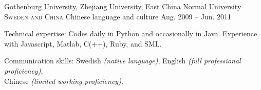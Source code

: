 \documentclass[10pt,a4paper]{article}
\begin{document}
\headedsection
  {\href{http://gu.se/english/}{Gothenburg University, Zhejiang University, East China Normal University}}
  {\textsc{Sweden and China}} {%
  \headedsubsection
    {Chinese language and culture}
    {Aug. 2009 -- Jun. 2011} {}
}

\spacedhrule{0.5em}{-0.4em}


\inlineheadsection  %
  {Technical expertise:}
  {Codes daily in Python and occasionally in Java. Experience with Javascript, Matlab, C(++), Ruby, and SML.}

\vspace{0.5em}
\inlineheadsection
  {Communication skills:}
  {Swedish \emph{(native language)}, English \emph{(full professional proficiency)}, \\Chinese \emph{(limited working proficiency)}.}
\end{document}
